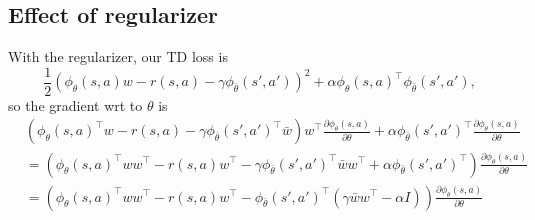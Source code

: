 \subsection{Effect of regularizer}
With the regularizer, our TD loss is
\[ \frac{1}{2}\left(\phi_\theta(s, a)w - r(s, a) - \gamma\phi_{\bar{\theta}}(s', a')\right)^2 + \alpha \phi_\theta(s, a)^\top \phi_{\bar{\theta}}(s', a'),\]
so the gradient wrt to $\theta$ is
\begin{align*}
  &\left(\phi_\theta(s, a)^\top w - r(s, a) - \gamma\phi_{\bar{\theta}}(s', a')^\top \bar{w} \right)w^\top\frac{\partial \phi_\theta(s, a)}{\partial \theta} + \alpha \phi_{\bar{\theta}}(s', a')^\top\frac{\partial \phi_\theta(s, a)}{\partial \theta}\\
  &=\left(\phi_\theta(s, a)^\top ww^\top - r(s, a)w^\top - \gamma\phi_{\bar{\theta}}(s', a')^\top \bar{w}w^\top + \alpha\phi_{\bar{\theta}}(s', a')^\top \right)\frac{\partial \phi_\theta(s, a)}{\partial \theta} \\ 
  &=\left(\phi_\theta(s, a)^\top ww^\top - r(s, a)w^\top - \phi_{\bar{\theta}}(s', a')^\top \left(\gamma\bar{w}w^\top - \alpha I \right)\right)\frac{\partial \phi_\theta(s, a)}{\partial \theta} \\ 
\end{align*}